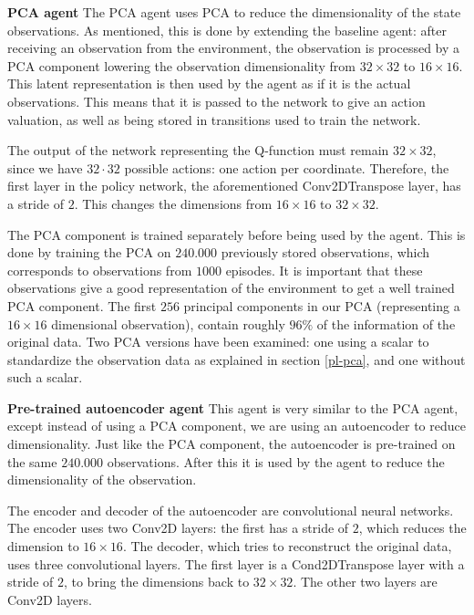 \noindent \textbf{PCA agent}\newline
\noindent The PCA agent uses PCA to reduce the dimensionality of the state observations. As mentioned, this is done by extending the baseline agent: after receiving an observation from the environment, the observation is processed by a PCA component lowering the observation dimensionality from $32 \times 32$ to $16 \times 16$. This latent representation is then used by the agent as if it is the actual observations. This means that it is passed to the network to give an action valuation, as well as being stored in transitions used to train the network.

The output of the network representing the Q-function must remain $32 \times 32$, since we have $32 \cdot 32$ possible actions: one action per coordinate. Therefore, the first layer in the policy network, the aforementioned Conv2DTranspose layer, has a stride of $2$. This changes the dimensions from $16 \times 16$ to $32 \times 32$. 

The PCA component is trained separately before being used by the agent. This is done by training the PCA on $240.000$ previously stored observations, which corresponds to observations from $1000$ episodes. It is important that these observations give a good representation of the environment to get a well trained PCA component. The first $256$ principal components in our PCA (representing a $16 \times 16$ dimensional observation), contain roughly $96\%$ of the information of the original data. Two PCA versions have been examined: one using a scalar to standardize the observation data as explained in section \ref{pl-pca}, and one without such a scalar.\newline

\noindent \textbf{Pre-trained autoencoder agent}\newline
\noindent This agent is very similar to the PCA agent, except instead of using a PCA component, we are using an autoencoder to reduce dimensionality. Just like the PCA component, the autoencoder is pre-trained on the same $240.000$ observations. After this it is used by the agent to reduce the dimensionality of the observation. 

The encoder and decoder of the autoencoder are convolutional neural networks. The encoder uses two Conv2D layers: the first has a stride of $2$, which reduces the dimension to $16 \times 16$. The decoder, which tries to reconstruct the original data, uses three convolutional layers. The first layer is a Cond2DTranspose layer with a stride of $2$, to bring the dimensions back to $32 \times 32$. The other two layers are Conv2D layers. 

